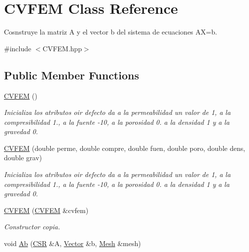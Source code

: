 \hypertarget{class_c_v_f_e_m}{}\section{C\+V\+F\+EM Class Reference}
\label{class_c_v_f_e_m}


Cosnstruye la matriz A y el vector b del sistema de ecuaciones AX=b.  




{\ttfamily \#include $<$C\+V\+F\+E\+M.\+hpp$>$}

\subsection*{Public Member Functions}
\begin{DoxyCompactItemize}
\item 
\hypertarget{class_c_v_f_e_m_a9c9edac26e4899b01f5665084f7a27f4}{}\label{class_c_v_f_e_m_a9c9edac26e4899b01f5665084f7a27f4} 
\hyperlink{class_c_v_f_e_m_a9c9edac26e4899b01f5665084f7a27f4}{C\+V\+F\+EM} ()
\begin{DoxyCompactList}\small\item\em Inicializa los atributos oir defecto da a la permeabilidad un valor de 1, a la compresibilidad 1., a la fuente -\/10, a la porosidad 0. a la densidad 1 y a la gravedad 0. \end{DoxyCompactList}\item 
\hypertarget{class_c_v_f_e_m_a76eb5e0647bc2c059f9fc23de827f9df}{}\label{class_c_v_f_e_m_a76eb5e0647bc2c059f9fc23de827f9df} 
\hyperlink{class_c_v_f_e_m_a76eb5e0647bc2c059f9fc23de827f9df}{C\+V\+F\+EM} (double perme, double compre, double fuen, double poro, double dens, double grav)
\begin{DoxyCompactList}\small\item\em Inicializa los atributos oir defecto da a la permeabilidad un valor de 1, a la compresibilidad 1., a la fuente -\/10, a la porosidad 0. a la densidad 1 y a la gravedad 0. \end{DoxyCompactList}\item 
\hyperlink{class_c_v_f_e_m_a8382798f83bbe4aa428594c56966205c}{C\+V\+F\+EM} (\hyperlink{class_c_v_f_e_m}{C\+V\+F\+EM} \&cvfem)
\begin{DoxyCompactList}\small\item\em Constructor copia. \end{DoxyCompactList}\item 
void \hyperlink{class_c_v_f_e_m_a6d522b327c439e211eaafde5695e83f9}{Ab} (\hyperlink{class_c_s_r}{C\+SR} \&A, \hyperlink{class_vector}{Vector} \&b, \hyperlink{class_mesh}{Mesh} \&mesh)

\end{DoxyCompactItemize}
